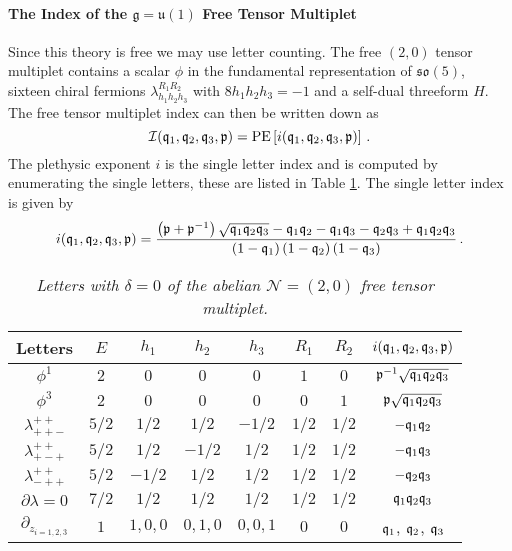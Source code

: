 \documentclass[main.tex]{subfiles}
\begin{document}
\paragraph{The Index of the \texorpdfstring{$\mathfrak{g}=\mathfrak{u}(1)$}{g=u(1)} Free Tensor Multiplet}
Since this theory is free we may use letter counting.  The free $(2,0)$ tensor multiplet contains a scalar $\phi$ in the fundamental representation of $\mathfrak{so}(5)$, sixteen chiral fermions $\lambda_{h_1h_2h_3}^{R_1R_2}$ with $8h_1h_2h_3=-1$ and a self-dual threeform $H$.  The free tensor multiplet index can then be written down as
\begin{equation}\label{eqn:freetensor}
\mathcal{I}(\mathfrak{q}_1,\mathfrak{q}_2,\mathfrak{q}_3,\mathfrak{p})=\operatorname{\mathrm{PE}}\left[i(\mathfrak{q}_1,\mathfrak{q}_2,\mathfrak{q}_3,\mathfrak{p})\right]\,.
\end{equation}
The plethysic exponent $i$ is the single letter index and is computed by enumerating the single letters, these are listed in Table \ref{fig:freetensor}.  The single letter index is given by
\begin{equation}\label{eqn:freetensorsing}
i(\mathfrak{q}_1,\mathfrak{q}_2,\mathfrak{q}_3,\mathfrak{p})=\frac{\left(\mathfrak{p}+\mathfrak{p}^{-1}\right)\sqrt{\mathfrak{q}_1\mathfrak{q}_2\mathfrak{q}_3}-\mathfrak{q}_1\mathfrak{q}_2-\mathfrak{q}_1\mathfrak{q}_3-\mathfrak{q}_2\mathfrak{q}_3+\mathfrak{q}_1\mathfrak{q}_2\mathfrak{q}_3}{\left(1-\mathfrak{q}_1\right)\left(1-\mathfrak{q}_2\right)\left(1-\mathfrak{q}_3\right)}\,.
\end{equation}
\begin{table}
\centering
\begin{tabular}{|c||c|c|c|c|c|c|c|} 
\hline
\textrm{Letters}  & $E$ & $h_1$ & $h_2$ & $h_3$ & $R_1$ & $R_2$ &$i(\mathfrak{q}_1,\mathfrak{q}_2,\mathfrak{q}_3,\mathfrak{p})$\\ 
  \hline\hline
 $\phi^{1}$ & $2$ & $0$ & $0$ & $0$ & $1$ & $0$ & $\mathfrak{p}^{-1}\sqrt{\mathfrak{q}_1\mathfrak{q}_2\mathfrak{q}_3}$\\ 
 \hline
 $\phi^3$ & $2$ & $0$ & $0$ & $0$ & $0$ & $1$ & $\mathfrak{p}\sqrt{\mathfrak{q}_1\mathfrak{q}_2\mathfrak{q}_3}$\\ 
 \hline
   $\lambda_{++-}^{++}$ & $5/2$ & $1/2$ & $1/2$ & $-1/2$ & $1/2$ & $1/2$& $-\mathfrak{q}_1\mathfrak{q}_2$\\ 
 \hline
   $\lambda_{+-+}^{++}$ & $5/2$ & $1/2$ & $-1/2$ & $1/2$ & $1/2$ & $1/2$& $-\mathfrak{q}_1\mathfrak{q}_3$\\ 
 \hline
    $\lambda_{-++}^{++}$ & $5/2$ & $-1/2$ & $1/2$ & $1/2$ & $1/2$ & $1/2$&$-\mathfrak{q}_2\mathfrak{q}_3$\\ 
 \hline\hline
      $\partial\lambda=0$& $7/2$ & $1/2$ & $1/2$ & $1/2$ & $1/2$ & $1/2$ & $\mathfrak{q}_1\mathfrak{q}_2\mathfrak{q}_3$\\ 
 \hline\hline
   $\partial_{z_{i=1,2,3}}$ & $1$ & $1,0,0$ & $0,1,0$ & $0,0,1$ & $0$ & $0$ &$\mathfrak{q}_1$, $\mathfrak{q}_2$, $\mathfrak{q}_3$\\ 
 \hline
\end{tabular}
\caption{\textit{Letters with $\delta=0$ of the abelian $\mathcal{N}=(2,0)$ free tensor multiplet.}}
\label{fig:freetensor}
\end{table}
\end{document}
